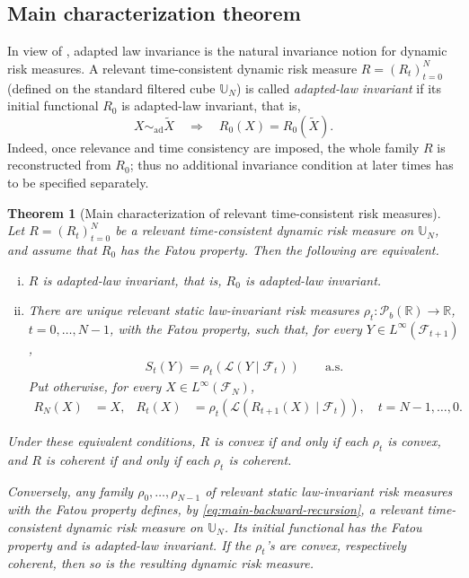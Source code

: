 \documentclass[a4paper]{amsart}
\newtheorem{theorem}{Theorem}[section]
\theoremstyle{definition}
\newcommand{\R}{\mathbb{R}}
\newcommand{\F}{\mathcal{F}}
\newcommand{\simad}{\sim_{\mathrm{ad}}}
\newcommand{\law}{\mathcal{L}}
\newcommand{\Pc}{\mathcal P}
\begin{document}
\subsection{Main characterization theorem}
\label{subsec:main-characterization}

In view of , adapted law invariance is the
natural invariance notion for dynamic risk measures. A relevant
time-consistent dynamic risk measure \(R=(R_t)_{t=0}^N\) (defined on the
standard filtered cube \(\mathbb U_N\)) is called \emph{adapted-law invariant} if
its initial functional \(R_0\) is adapted-law invariant, that is,
\[
X\simad\widetilde X
\quad\Longrightarrow\quad
R_0(X)=R_0(\widetilde X).
\]
Indeed, once relevance and time consistency are imposed, the whole family
\(R\) is reconstructed from \(R_0\); thus no additional invariance condition at
later times has to be specified separately.

\begin{theorem}[Main characterization of relevant time-consistent risk measures]
\label{thm:main-dynamic-characterization}
\label{thm:main-standard-cube}
Let \(R=(R_t)_{t=0}^N\) be a relevant time-consistent dynamic risk measure on
\(\mathbb U_N\), and assume that \(R_0\) has the Fatou property. Then the
following are equivalent.

\begin{enumerate}[(i)]
\item \(R\) is adapted-law invariant, that is, \(R_0\) is adapted-law invariant.

\item There are unique relevant static law-invariant risk measures
\(\rho_t:\Pc_b(\R)\to\R\), \(t=0,\dots,N-1\), with the Fatou property, such
that, for every \(Y\in L^\infty(\F_{t+1})\),
\begin{align}
S_t(Y)=\rho_t(\law(Y\mid\F_t))
\qquad\text{a.s.}
\label{eq:main-one-step-representation}
\end{align}
Put otherwise, for every \(X\in L^\infty(\F_N)\),
\begin{align}
R_N(X)&=X,
&
R_t(X)&=\rho_t(\law(R_{t+1}(X)\mid\F_t)),
\quad t=N-1,\dots,0.
\label{eq:main-backward-recursion}
\end{align}
\end{enumerate}


Under these equivalent conditions, \(R\) is convex if and only if each
\(\rho_t\) is convex, and \(R\) is coherent if and only if each \(\rho_t\) is
coherent.

Conversely, any family \(\rho_0,\dots,\rho_{N-1}\) of relevant static
law-invariant risk measures with the Fatou property defines, by
\eqref{eq:main-backward-recursion}, a relevant time-consistent dynamic risk
measure on \(\mathbb U_N\). Its initial functional has the Fatou property and
is adapted-law invariant. If the $\rho_t$'s are convex, respectively
coherent, then so is the resulting dynamic risk measure.
\end{theorem}
\end{document}
